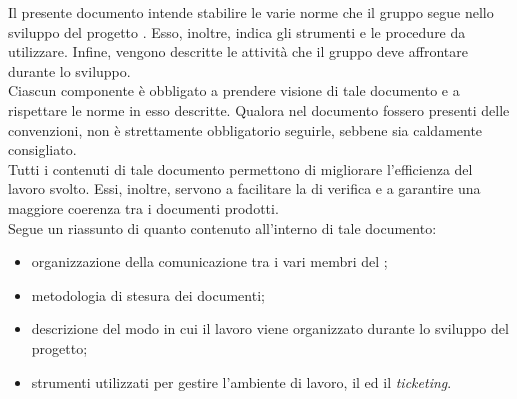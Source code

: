 		Il presente documento intende stabilire le varie norme che il gruppo \groupname{} segue nello sviluppo del progetto \projectname{}. Esso, inoltre, indica gli strumenti e le procedure da utilizzare. Infine, vengono descritte le attività che il gruppo deve affrontare durante lo sviluppo.\\
		Ciascun componente è obbligato a prendere visione di tale documento e a rispettare le norme in esso descritte. Qualora nel documento fossero presenti delle convenzioni, non è strettamente obbligatorio seguirle, sebbene sia caldamente consigliato.\\
		Tutti i contenuti di tale documento permettono di migliorare l’efficienza del lavoro svolto. Essi, inoltre, servono a facilitare la  di verifica e a garantire una maggiore coerenza tra i documenti prodotti.\\
		Segue un riassunto di quanto contenuto all'interno di tale documento:
		\begin{itemize}
			\item organizzazione della comunicazione tra i vari membri del ;
			\item metodologia di stesura dei documenti;
			\item descrizione del modo in cui il lavoro viene organizzato durante lo sviluppo del progetto;
			\item strumenti utilizzati per gestire l'ambiente di lavoro, il  ed il \textit{ticketing}.
		\end{itemize}

	
	


